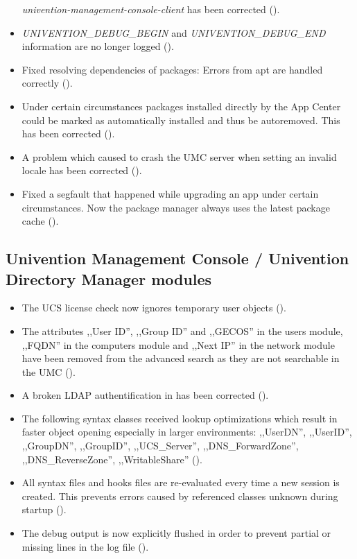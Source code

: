 \begin{itemize}
  \emph{univention-management-console-client} has been corrected
  ().
\item \emph{UNIVENTION\_DEBUG\_BEGIN} and \emph{UNIVENTION\_DEBUG\_END}
  information are no longer logged ().
\item Fixed resolving dependencies of packages: Errors from apt are handled
  correctly ().
\item Under certain circumstances packages installed directly by the App Center
  could be marked as automatically installed and thus be autoremoved. This has
  been corrected ().
\item A problem which caused to crash the UMC server when setting an
  invalid locale has been corrected ().
\item Fixed a segfault that happened while upgrading an app under certain
  circumstances. Now the package manager always uses the latest package cache
  ().
\end{itemize}

\subsection{Univention Management Console / Univention Directory Manager modules}
\begin{itemize}
\item The UCS license check now ignores temporary user objects ().
\item The attributes ,,User ID'', ,,Group ID'' and ,,GECOS'' in the users module, ,,FQDN'' in the computers
  module and ,,Next IP'' in the network module have been removed from the advanced search as they
  are not searchable in the UMC ().
\item A broken LDAP authentification in  has been corrected ().
\item The following syntax classes received lookup optimizations
  which result in faster object opening especially in larger environments:
  ,,UserDN'', ,,UserID'', ,,GroupDN'', ,,GroupID'', ,,UCS\_Server'',
  ,,DNS\_ForwardZone'', ,,DNS\_ReverseZone'', ,,WritableShare''
  ().
\item All syntax files and hooks files are re-evaluated every time a new
  session is created. This prevents errors caused by referenced classes unknown
  during  startup
  ().
\item The debug output is now explicitly flushed in order to prevent
  partial or missing lines in the log file ().
\end{itemize}

